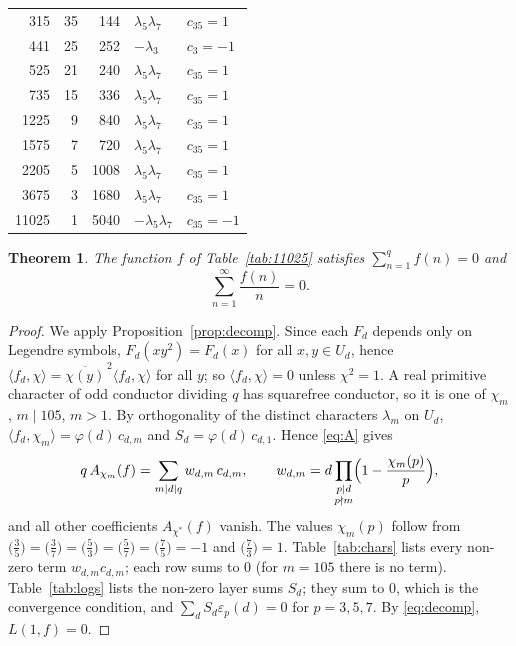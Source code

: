 \documentclass[11pt]{amsart}
\newtheorem{theorem}{Theorem}[section]
\theoremstyle{definition}
\theoremstyle{remark}
\newcommand{\ip}[2]{\langle #1,#2\rangle}
\numberwithin{equation}{section}
\begin{document}
\begin{longtable}{rrrll}
315 & 35 & 144 & $\lambda_5\lambda_7$ & $c_{35}=1$\\
441 & 25 & 252 & $-\lambda_3$ & $c_{3}=-1$\\
525 & 21 & 240 & $\lambda_5\lambda_7$ & $c_{35}=1$\\
735 & 15 & 336 & $\lambda_5\lambda_7$ & $c_{35}=1$\\
1225 & 9 & 840 & $\lambda_5\lambda_7$ & $c_{35}=1$\\
1575 & 7 & 720 & $\lambda_5\lambda_7$ & $c_{35}=1$\\
2205 & 5 & 1008 & $\lambda_5\lambda_7$ & $c_{35}=1$\\
3675 & 3 & 1680 & $\lambda_5\lambda_7$ & $c_{35}=1$\\
11025 & 1 & 5040 & $-\lambda_5\lambda_7$ & $c_{35}=-1$\\
\bottomrule\end{longtable}


\begin{theorem}\label{thm:11025}
The function $f$ of Table~\ref{tab:11025} satisfies $\sum_{n=1}^{q}f(n)=0$ and
\[
\sum_{n=1}^{\infty}\frac{f(n)}{n}=0.
\]
\end{theorem}

\begin{proof}
We apply Proposition~\ref{prop:decomp}.
Since each $F_d$ depends only on Legendre symbols, $F_d(xy^2)=F_d(x)$ for all $x,y\in U_d$, hence $\ip{f_d}{\chi}=\overline{\chi(y)}^{\,2}\ip{f_d}{\chi}$ for all $y$; so $\ip{f_d}{\chi}=0$ unless $\chi^2=1$.
A real primitive character of odd conductor dividing $q$ has squarefree conductor, so it is one of $\chi_m$, $m\mid105$, $m>1$.
By orthogonality of the distinct characters $\lambda_m$ on $U_d$, $\ip{f_d}{\chi_m}=\varphi(d)\,c_{d,m}$ and $S_d=\varphi(d)\,c_{d,1}$.
Hence \eqref{eq:A} gives
\[
q\,A_{\chi_m}(f)=\sum_{m\mid d\mid q}w_{d,m}\,c_{d,m},\qquad w_{d,m}=d\prod_{\substack{p\mid d\\p\nmid m}}\Bigl(1-\frac{\chi_m(p)}{p}\Bigr),
\]
and all other coefficients $A_{\chi^*}(f)$ vanish.
The values $\chi_m(p)$ follow from $\bigl(\frac35\bigr)=\bigl(\frac37\bigr)=\bigl(\frac53\bigr)=\bigl(\frac57\bigr)=\bigl(\frac75\bigr)=-1$ and $\bigl(\frac73\bigr)=1$.
Table~\ref{tab:chars} lists every non-zero term $w_{d,m}c_{d,m}$; each row sums to $0$ (for $m=105$ there is no term).
Table~\ref{tab:logs} lists the non-zero layer sums $S_d$; they sum to $0$, which is the convergence condition, and $\sum_dS_d\varepsilon_p(d)=0$ for $p=3,5,7$.
By \eqref{eq:decomp}, $L(1,f)=0$.
\end{proof}
\end{document}
